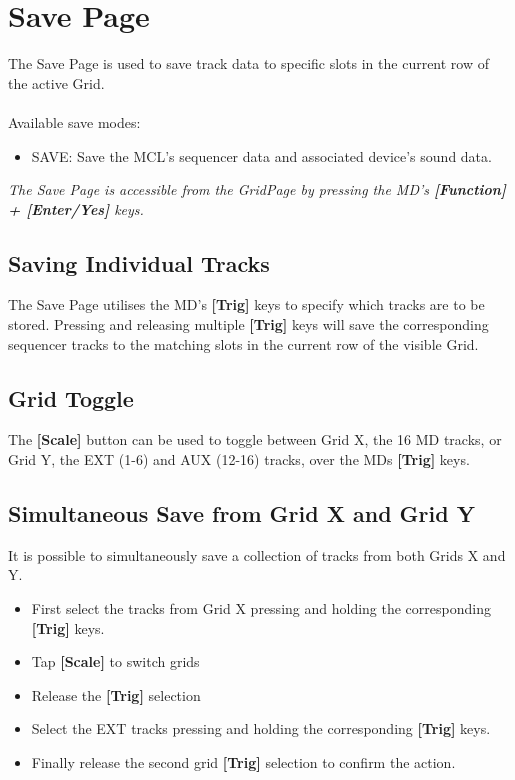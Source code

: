 \chapter{Save Page}

The Save Page is used to save track data to specific slots in the current row of the active Grid.\\
\\
Available save modes:
\begin{itemize}
    \item SAVE: Save the MCL's sequencer data and associated device's sound data.
\end{itemize}


\textit{The Save Page is accessible from the GridPage by pressing the MD's \textbf{[Function] + [Enter/Yes]} keys.}

\section{Saving Individual Tracks}
The Save Page utilises the MD's \textbf{[Trig]} keys to specify which tracks are to be stored. Pressing and releasing multiple \textbf{[Trig]} keys will  save the corresponding sequencer tracks to the matching slots in the current row of the visible Grid.
\section{Grid Toggle}
The \textbf{[Scale]} button can be used to toggle between Grid X, the 16 MD tracks, or Grid Y, the EXT (1-6) and AUX (12-16) tracks, over the MDs \textbf{[Trig]} keys.
\newpage
\section{Simultaneous Save from Grid X and Grid Y}
It is possible to simultaneously save a collection of tracks from both Grids X and Y.
\begin{itemize}
\item First select the tracks from Grid X pressing and holding the corresponding \textbf{[Trig]} keys.
\item Tap \textbf{[Scale]} to switch grids
\item Release the \textbf{[Trig]} selection
\item Select the EXT tracks pressing and holding the corresponding \textbf{[Trig]} keys. 
\item Finally release the second grid \textbf{[Trig]} selection to confirm the action. 
\end{itemize}

